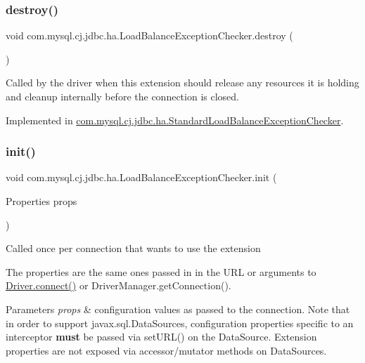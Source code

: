\subsubsection{\texorpdfstring{destroy()}{destroy()}}
{\footnotesize\ttfamily void com.\+mysql.\+cj.\+jdbc.\+ha.\+Load\+Balance\+Exception\+Checker.\+destroy (\begin{DoxyParamCaption}{ }\end{DoxyParamCaption})}

Called by the driver when this extension should release any resources it is holding and cleanup internally before the connection is closed. 

Implemented in \mbox{\hyperlink{classcom_1_1mysql_1_1cj_1_1jdbc_1_1ha_1_1_standard_load_balance_exception_checker_aaa6fc4e1cc5b3c781bc9ce11b9b76269}{com.\+mysql.\+cj.\+jdbc.\+ha.\+Standard\+Load\+Balance\+Exception\+Checker}}.

\mbox{\label{interfacecom_1_1mysql_1_1cj_1_1jdbc_1_1ha_1_1_load_balance_exception_checker_a41c1fd3f7eb7f6cd92cc174465b6574e}} 
\subsubsection{\texorpdfstring{init()}{init()}}
{\footnotesize\ttfamily void com.\+mysql.\+cj.\+jdbc.\+ha.\+Load\+Balance\+Exception\+Checker.\+init (\begin{DoxyParamCaption}\item[{Properties}]{props }\end{DoxyParamCaption})}

Called once per connection that wants to use the extension

The properties are the same ones passed in in the U\+RL or arguments to \mbox{\hyperlink{classcom_1_1mysql_1_1cj_1_1jdbc_1_1_non_registering_driver_ab3fd3d522550db032eab6c240b554e3e}{Driver.\+connect()}} or Driver\+Manager.\+get\+Connection().


\begin{DoxyParams}{Parameters}
{\em props} & configuration values as passed to the connection. Note that in order to support javax.\+sql.\+Data\+Sources, configuration properties specific to an interceptor {\bfseries must} be passed via set\+U\+R\+L() on the Data\+Source. Extension properties are not exposed via accessor/mutator methods on Data\+Sources. \\
\hline
\end{DoxyParams}


